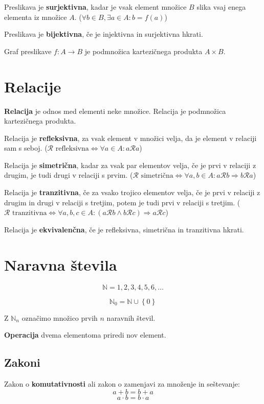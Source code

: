 \documentclass[a4paper,oneside,12pt,fleqn]{article}
\def\N{\ensuremath{\mathbb N}}
\newcommand\krat\cdot
\newcommand{\Rel}{\mathcal{R}}
\renewcommand\implies\Rightarrow
\renewcommand\iff\Leftrightarrow
\numberwithin{equation}{section}
\begin{document}
Preslikava je \textbf{surjektivna}, kadar je vsak element množice $B$ slika vsaj enega elementa iz
množice $A$. ($\forall b \in B, \exists a \in A\!: b = f(a)$)

Preslikava je \textbf{bijektivna}, če je injektivna in surjektivna hkrati.

Graf preslikave $f\!\!: A \rightarrow B$ je podmnožica kartezičnega produkta $A \times B$.

\section{Relacije}
\label{sec:relacije}
\textbf{Relacija} je odnos med elementi neke množice.
Relacija je podmnožica kartezičnega produkta.

Relacija je \textbf{refleksivna}, za vsak element v množici velja, da je element v relaciji sam s
seboj. ($\Rel \text{ refleksivna} \iff \forall a \in A\!: a \Rel a$)

Relacija je \textbf{simetrična}, kadar za vsak par elementov velja, če je prvi v relaciji z drugim,
je tudi drugi v relaciji s prvim. 
($\Rel \text{ simetrična} \iff \forall a, b \in A\!: a \Rel b \implies b \Rel a$)

Relacija je \textbf{tranzitivna}, če za vsako trojico elementov velja, če je prvi v relaciji z
drugim in drugi v relaciji s tretjim, potem je tudi prvi v relaciji s tretjim.
($\Rel \text{ tranzitivna} \iff \forall a, b, c \in A\!: (a \Rel b \land b \Rel c) \implies a \Rel c$)

Relacija je \textbf{ekvivalenčna}, če je refleksivna, simetrična in tranzitivna hkrati.

\section{Naravna števila}
\label{sec:naravna}
\[ \N = {1, 2, 3, 4, 5, 6, \ldots} \]

\[ \N_0 = \N \cup \left\{ 0 \right\} \]

Z $\N_n$ označimo množico prvih $n$ naravnih števil.


\textbf{Operacija} dvema elementoma priredi nov element.

\subsection{Zakoni}
\label{sec:naravna:zakoni}
Zakon o \textbf{komutativnosti} ali zakon o zamenjavi za množenje in seštevanje:
\[ a + b =  b + a \]
\[ a \krat b =  b \krat a \]
\end{document}
